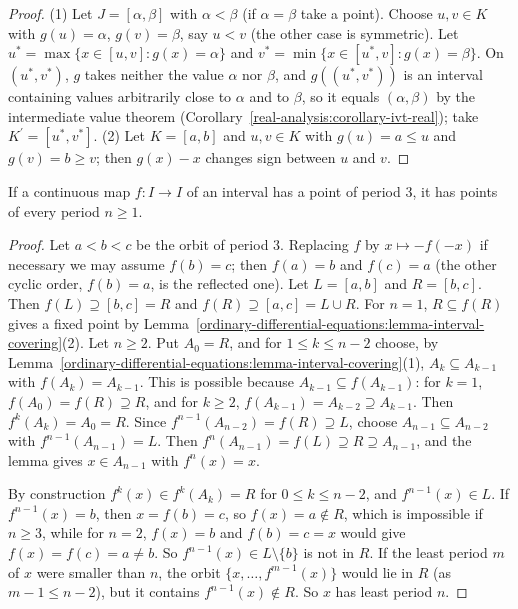 \begin{proof}
(1) Let $J = [\alpha, \beta]$ with $\alpha < \beta$ (if $\alpha = \beta$ take a point). Choose $u, v \in K$ with $g(u) = \alpha$, $g(v) = \beta$, say $u < v$ (the other case is symmetric). Let $u^* = \max\{x \in [u, v] : g(x) = \alpha\}$ and
$v^* = \min\{x \in [u^*, v] : g(x) = \beta\}$. On $(u^*, v^*)$, $g$ takes neither the value $\alpha$ nor $\beta$, and $g((u^*, v^*))$ is an interval containing values arbitrarily close to $\alpha$ and to $\beta$, so it equals $(\alpha, \beta)$ by the
intermediate value theorem (Corollary~\ref{real-analysis:corollary-ivt-real}); take $K^{\prime} = [u^*, v^*]$. (2) Let $K = [a, b]$ and $u, v \in K$ with $g(u) = a \leq u$ and $g(v) = b \geq v$; then $g(x) - x$ changes sign between $u$ and $v$.
\end{proof}

\begin{theorem}\label{ordinary-differential-equations:theorem-period-three}
If a continuous map $f \colon I \to I$ of an interval has a point of period $3$, it has points of every period $n \geq 1$.
\end{theorem}

\begin{proof}
Let $a < b < c$ be the orbit of period $3$. Replacing $f$ by $x \mapsto -f(-x)$ if necessary we may assume $f(b) = c$; then $f(a) = b$ and $f(c) = a$ (the other cyclic order, $f(b) = a$, is the reflected one). Let $L = [a, b]$ and $R = [b, c]$.
Then $f(L) \supseteq [b, c] = R$ and $f(R) \supseteq [a, c] = L \cup R$. For $n = 1$, $R \subseteq f(R)$ gives a fixed point by Lemma~\ref{ordinary-differential-equations:lemma-interval-covering}(2). Let $n \geq 2$. Put $A_0 = R$, and for
$1 \leq k \leq n - 2$ choose, by Lemma~\ref{ordinary-differential-equations:lemma-interval-covering}(1), $A_k \subseteq A_{k-1}$ with $f(A_k) = A_{k-1}$. This is possible because $A_{k-1} \subseteq f(A_{k-1})$: for $k = 1$, $f(A_0) = f(R) \supseteq R$, and for $k \geq 2$,
$f(A_{k-1}) = A_{k-2} \supseteq A_{k-1}$. Then $f^k(A_k) = A_0 = R$. Since $f^{n-1}(A_{n-2}) = f(R) \supseteq L$, choose $A_{n-1} \subseteq A_{n-2}$ with $f^{n-1}(A_{n-1}) = L$. Then
$f^n(A_{n-1}) = f(L) \supseteq R \supseteq A_{n-1}$, and the lemma gives $x \in A_{n-1}$ with $f^n(x) = x$.

By construction $f^k(x) \in f^k(A_k) = R$ for $0 \leq k \leq n - 2$, and $f^{n-1}(x) \in L$. If $f^{n-1}(x) = b$, then $x = f(b) = c$, so $f(x) = a \notin R$, which is impossible if $n \geq 3$, while for $n = 2$, $f(x) = b$ and $f(b) = c = x$ would give
$f(x) = f(c) = a \neq b$. So $f^{n-1}(x) \in L \setminus \{b\}$ is not in $R$. If the least period $m$ of $x$ were smaller than $n$, the orbit $\{x, \ldots, f^{m-1}(x)\}$ would lie in $R$ (as $m - 1 \leq n - 2$), but it contains $f^{n-1}(x) \notin R$.
So $x$ has least period $n$.
\end{proof}

